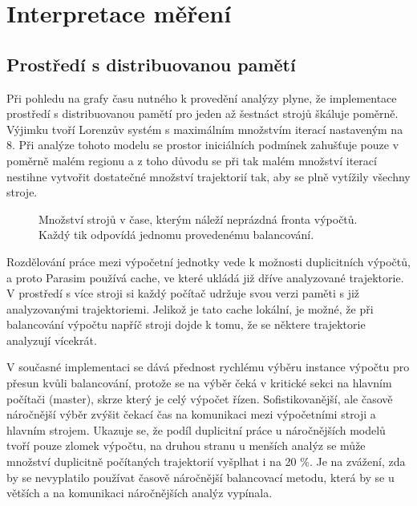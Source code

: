 \section{Interpretace měření}

\subsection{Prostředí s distribuovanou pamětí}

Při pohledu na grafy času nutného k provedění analýzy plyne, že implementace
prostředí s distribuovanou pamětí pro jeden až šestnáct strojů šká\-lu\-je poměrně. Výjimku tvoří
Lorenzův systém s maximálním množ\-stvím iterací nastaveným na 8. Při analýze tohoto modelu
se prostor iniciálních podmínek zahušťuje pouze v poměrně malém regionu a z toho důvodu se při tak
malém množství iterací nestihne vytvořit dostatečné množství trajektorií tak, aby se plně
vytížily všechny stroje. 

\begin{figure}[h!]
\begin{center}
\caption{Množství strojů v čase, kterým náleží neprázdná fronta výpočtů. Každý tik odpovídá jednomu provedenému balancování.}
\end{center}
\end{figure}

Rozdělování práce mezi výpočetní jednotky vede k možnosti du\-pli\-cit\-ních výpočtů,
a proto Parasim používá cache, ve které ukládá již dříve analyzované trajektorie.
V prostředí s více stroji si každý počítač udržuje svou verzi paměti s již
analyzovanými trajektoriemi. Jelikož je tato cache lokální, je možné, že při balancování
výpočtu napříč stroji dojde k tomu, že se některe trajektorie analyzují vícekrát.

V současné implementaci se dává přednost rychlému výběru instance výpočtu pro
přesun kvůli balancování, protože se na výběr čeká v kritické sekci na hlavním
počítači (master), skrze který je celý výpočet řízen. Sofistikovanější, ale časově
náročnější výběr zvýšit čekací čas na komunikaci mezi výpočetními stroji a hlavním strojem.
Ukazuje se, že podíl duplicitní práce u náročnějších modelů tvoří pouze zlomek výpočtu,
na druhou stranu u menších analýz se může množství duplicitně počítaných trajektorií
vyšplhat i na 20 \%. Je na zvážení, zda by se nevyplatilo používat časově náročnější
balancovací metodu, která by se u větších a na komunikaci náročnějších analýz vypínala.

